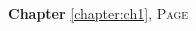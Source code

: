 
\begin{multicols}{2}
      \setlength{\parindent}{0pt}
      \footnotesize{

\textbf{Chapter} \ref{chapter:ch1}, \textsc{Page} \pageref{chapter:ch1} \\

      }
\end{multicols}

